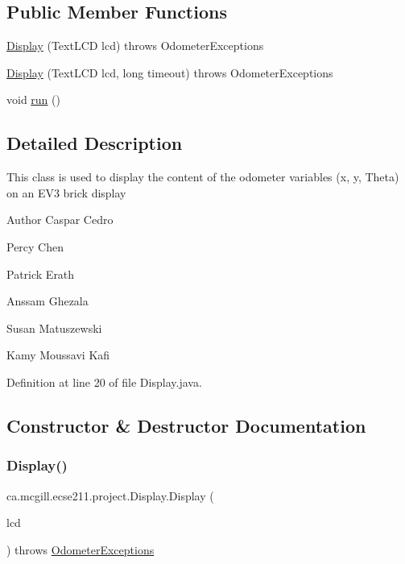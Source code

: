 \subsection*{Public Member Functions}
\begin{DoxyCompactItemize}
\item 
\hyperlink{classca_1_1mcgill_1_1ecse211_1_1project_1_1_display_af0970123ca090749bfb2f5b9f478c01d}{Display} (Text\+L\+CD lcd)  throws Odometer\+Exceptions 
\item 
\hyperlink{classca_1_1mcgill_1_1ecse211_1_1project_1_1_display_a690cd91bcc8024950c2b8e3b2613c801}{Display} (Text\+L\+CD lcd, long timeout)  throws Odometer\+Exceptions 
\item 
void \hyperlink{classca_1_1mcgill_1_1ecse211_1_1project_1_1_display_ab508a8bc2b738499bec2c432a814cba5}{run} ()
\end{DoxyCompactItemize}


\subsection{Detailed Description}
This class is used to display the content of the odometer variables (x, y, Theta) on an E\+V3 brick display

\begin{DoxyAuthor}{Author}
Caspar Cedro 

Percy Chen 

Patrick Erath 

Anssam Ghezala 

Susan Matuszewski 

Kamy Moussavi Kafi 
\end{DoxyAuthor}


Definition at line 20 of file Display.\+java.



\subsection{Constructor \& Destructor Documentation}
\mbox{\label{classca_1_1mcgill_1_1ecse211_1_1project_1_1_display_af0970123ca090749bfb2f5b9f478c01d}} 
\subsubsection{\texorpdfstring{Display()}{Display()}\hspace{0.1cm}{\footnotesize\ttfamily [1/2]}}
{\footnotesize\ttfamily ca.\+mcgill.\+ecse211.\+project.\+Display.\+Display (\begin{DoxyParamCaption}\item[{Text\+L\+CD}]{lcd }\end{DoxyParamCaption}) throws \hyperlink{classca_1_1mcgill_1_1ecse211_1_1odometer_1_1_odometer_exceptions}{Odometer\+Exceptions}}

